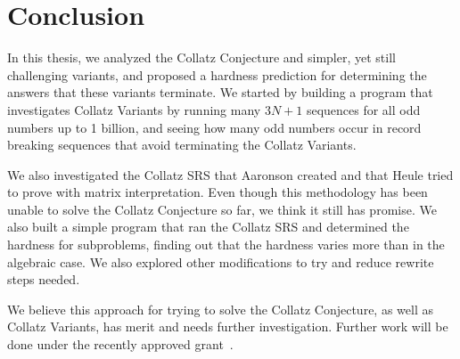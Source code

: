 \chapter{Conclusion} \label{sec:conclusion}
In this thesis, we analyzed the Collatz Conjecture and simpler, yet still challenging variants, and proposed a hardness prediction for determining the answers that these variants terminate. We started by building a program that investigates Collatz Variants by running many $3N+1$ sequences for all odd numbers up to 1 billion, and seeing how many odd numbers occur in record breaking sequences that avoid terminating the Collatz Variants. \par
We also investigated the Collatz SRS that Aaronson created and that Heule tried to prove with matrix interpretation. Even though this methodology has been unable to solve the Collatz Conjecture so far, we think it still has promise. We also built a simple program that ran the Collatz SRS and determined the hardness for subproblems, finding out that the hardness varies more than in the algebraic case. We also explored other modifications to try and reduce rewrite steps needed.\par
We believe this approach for trying to solve the Collatz Conjecture, as well as Collatz Variants, has merit and needs further investigation. Further work will be done under the recently approved grant~\cite{HeuleAaronsonGrant}.
